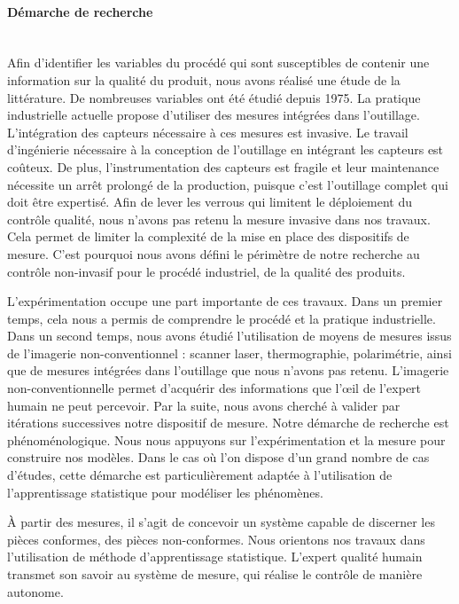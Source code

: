 \paragraph{Démarche de recherche}\mbox{} \\
Afin d'identifier les variables du procédé qui sont susceptibles de contenir une information sur la qualité du produit, nous avons réalisé une étude de la littérature.
De nombreuses variables ont été étudié depuis 1975.
La pratique industrielle actuelle propose d'utiliser des mesures intégrées dans l'outillage.
L'intégration des capteurs nécessaire à ces mesures est invasive.
Le travail d'ingénierie nécessaire à la conception de l'outillage en intégrant les capteurs est coûteux.
De plus, l'instrumentation des capteurs est fragile et leur maintenance nécessite un arrêt prolongé de la production, puisque c'est l'outillage complet qui doit être expertisé.
Afin de lever les verrous qui limitent le déploiement du contrôle qualité, nous n'avons pas retenu la mesure invasive dans nos travaux.
Cela permet de limiter la complexité de la mise en place des dispositifs de mesure.
C'est pourquoi nous avons défini le périmètre de notre recherche au contrôle non-invasif pour le procédé industriel, de la qualité des produits.

L'expérimentation occupe une part importante de ces travaux.
Dans un premier temps, cela nous a permis de comprendre le procédé et la pratique industrielle.
Dans un second temps, nous avons étudié l'utilisation de moyens de mesures issus de l'imagerie non-conventionnel : scanner laser, thermographie, polarimétrie, ainsi que de mesures intégrées dans l'outillage que nous n'avons pas retenu.
L'imagerie non-conventionnelle permet d'acquérir des informations que l'œil de l'expert humain ne peut percevoir.
Par la suite, nous avons cherché à valider par itérations successives notre dispositif de mesure.
Notre démarche de recherche est phénoménologique.
Nous nous appuyons sur l'expérimentation et la mesure pour construire nos modèles.  %
Dans le cas où l'on dispose d'un grand nombre de cas d'études, cette démarche est particulièrement adaptée à l'utilisation de l'apprentissage statistique pour modéliser les phénomènes.

À partir des mesures, il s'agit de concevoir un système capable de discerner les pièces conformes, des pièces non-conformes.
Nous orientons nos travaux dans l'utilisation de méthode d'apprentissage statistique.
L'expert qualité humain transmet son savoir au système de mesure, qui réalise le contrôle de manière autonome.

